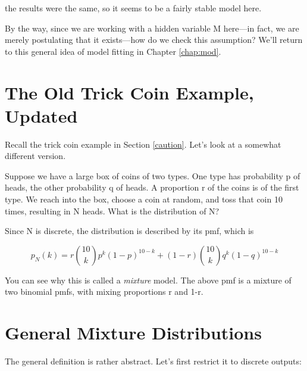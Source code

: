 \documentclass[11pt]{article}
\begin{document}
the results were the same, so it seems to be a fairly stable model here.

By the way, since we are working with a hidden variable M here---in
fact, we are merely postulating that it exists---how do we check this
assumption?  We'll return to this general idea of model fitting in
Chapter \ref{chap:mod}.

\section{The Old Trick Coin Example, Updated}
\label{oldtrick}

Recall the trick coin example in Section \ref{caution}.  Let's look at a
somewhat different version.

Suppose we have a large box of coins of two types. One type has
probability p of heads, the other probability q of heads. A proportion r
of the coins is of the first type. We reach into the box, choose a coin
at random, and toss that coin 10 times, resulting in N heads. What is
the distribution of N?

Since N is discrete, the distribution is described by its pmf, which is

\begin{equation}
\label{mixbinom}
p_N(k) = r \binom{10}{k} p^k (1-p)^{10-k} +
(1-r) \binom{10}{k} q^k (1-q)^{10-k}
\end{equation}

You can see why this is called a {\it mixture} model. The above pmf is a
mixture of two binomial pmfs, with mixing proportions r and 1-r.

\section{General Mixture Distributions}
\label{genmix}

The general definition is rather abstract.  Let's first restrict it to
discrete outputs:
\end{document}
